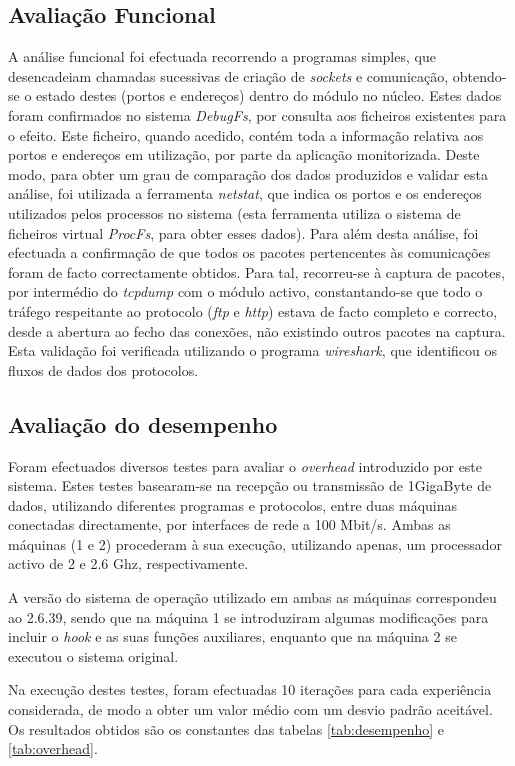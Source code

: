 \subsection{Avaliação Funcional}
A análise funcional foi efectuada recorrendo a programas simples, que desencadeiam chamadas sucessivas de criação de \textit{sockets} e comunicação, obtendo-se o estado destes (portos e endereços) dentro do módulo no núcleo.
Estes dados foram confirmados no sistema \textit{DebugFs}, por consulta aos ficheiros existentes para o efeito.
Este ficheiro, quando acedido, contém toda a informação relativa aos portos e endereços em utilização, por parte da aplicação monitorizada.
Deste modo, para obter um grau de comparação dos dados produzidos e validar esta análise, foi utilizada a ferramenta \textit{netstat}, que indica os portos e os endereços utilizados pelos processos no sistema (esta ferramenta utiliza o sistema de ficheiros virtual \textit{ProcFs}, para obter esses dados).
Para além desta análise, foi efectuada a confirmação de que todos os pacotes pertencentes às comunicações foram de facto correctamente obtidos.
Para tal, recorreu-se à captura de pacotes, por intermédio do \textit{tcpdump} com o módulo activo, constantando-se que todo o tráfego respeitante ao protocolo (\textit{ftp} e \textit{http}) estava de facto completo e correcto, desde a abertura ao fecho das conexões, não existindo outros pacotes na captura.
Esta validação foi verificada utilizando o programa \textit{wireshark}, que identificou os fluxos de dados dos protocolos.

\subsection{Avaliação do desempenho}
Foram efectuados diversos testes para avaliar o \emph{overhead} introduzido por este sistema.
 Estes testes basearam-se na recepção ou transmissão de 1GigaByte de dados, utilizando diferentes programas e protocolos, entre duas máquinas conectadas directamente, por interfaces de rede a 100 Mbit/s.
 Ambas as máquinas (1 e 2) procederam à sua execução, utilizando apenas, um processador activo de 2 e 2.6 Ghz, respectivamente.

A versão do sistema de operação utilizado em ambas as máquinas correspondeu ao 2.6.39, sendo que na máquina 1 se introduziram algumas modificações para incluir o \textit{hook} e as suas funções auxiliares, enquanto que na máquina 2 se executou o sistema original.

Na execução destes testes, foram efectuadas 10 iterações para cada experiência considerada, de modo a obter um valor médio com um desvio padrão aceitável.
 Os resultados obtidos são os constantes das tabelas \ref{tab:desempenho} e \ref{tab:overhead}.

